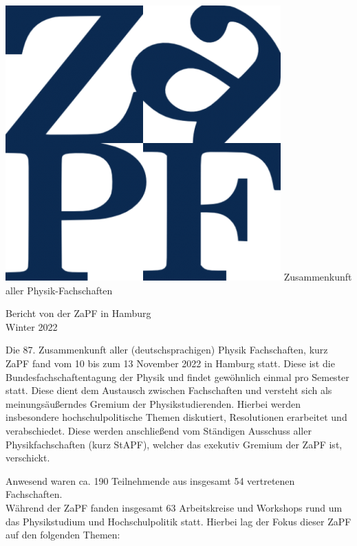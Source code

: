 \documentclass{scrartcl}
\begin{document}
	\hspace{0.74\textwidth}
	\begin{minipage}{0.25\textwidth}
		\vspace{-1cm}
		\centering
		\includegraphics[width=.89\textwidth]{logo.png}
		\small Zusammenkunft aller Physik-Fachschaften
	\end{minipage}
	
	\begin{center}
		\vspace{1.5cm}
		\huge{Bericht von der ZaPF in Hamburg \\ Winter 2022}
		\vspace{1cm}
	\end{center}
	
	Die 87. Zusammenkunft aller (deutschsprachigen) Physik Fachschaften, kurz ZaPF fand vom 10 bis zum 13 November 2022 in Hamburg statt. Diese ist die Bundesfachschaftentagung der Physik und findet gewöhnlich einmal pro Semester statt. Diese dient dem Austausch zwischen Fachschaften und versteht sich als meinungsäußerndes Gremium der Physikstudierenden. Hierbei werden insbesondere hochschulpolitische Themen diskutiert, Resolutionen erarbeitet und verabschiedet. Diese werden anschließend vom Ständigen Ausschuss aller Physikfachschaften (kurz StAPF), welcher das exekutiv Gremium der ZaPF ist, verschickt.
	
	Anwesend waren ca. 190 Teilnehmende aus insgesamt 54 vertretenen Fachschaften.\\
	Während der ZaPF fanden insgesamt 63 Arbeitskreise und Workshops rund um das Physikstudium und Hochschulpolitik statt. Hierbei lag der Fokus dieser ZaPF auf den folgenden Themen:
	
\end{document}
